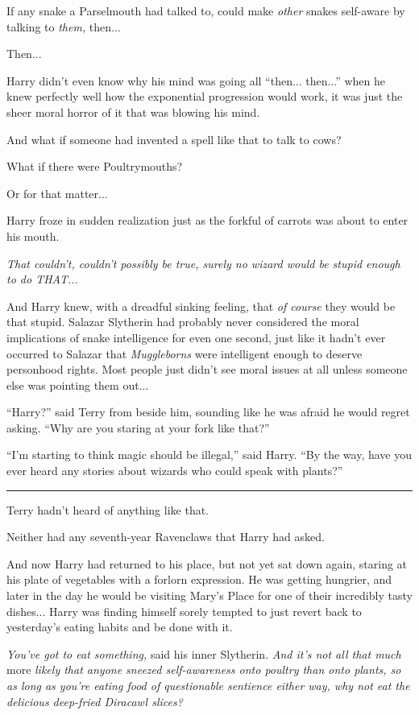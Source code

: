 If any snake a Parselmouth had talked to, could make \emph{other} snakes self-aware by talking to \emph{them,} then...

Then...

Harry didn't even know why his mind was going all ``then... then...'' when he knew perfectly well how the exponential progression would work, it was just the sheer moral horror of it that was blowing his mind.

And what if someone had invented a spell like that to talk to cows?

What if there were Poultrymouths?

Or for that matter...

Harry froze in sudden realization just as the forkful of carrots was about to enter his mouth.

\emph{That couldn't, couldn't possibly be true, surely no wizard would be stupid enough to do THAT...}

And Harry knew, with a dreadful sinking feeling, that \emph{of course} they would be that stupid. Salazar Slytherin had probably never considered the moral implications of snake intelligence for even one second, just like it hadn't ever occurred to Salazar that \emph{Muggleborns} were intelligent enough to deserve personhood rights. Most people just didn't see moral issues at all unless someone else was pointing them out...

``Harry?'' said Terry from beside him, sounding like he was afraid he would regret asking. ``Why are you staring at your fork like that?''

``I'm starting to think magic should be illegal,'' said Harry. ``By the way, have you ever heard any stories about wizards who could speak with plants?''

\begin{center}\rule{3in}{0.4pt}\end{center}

Terry hadn't heard of anything like that.

Neither had any seventh-year Ravenclaws that Harry had asked.

And now Harry had returned to his place, but not yet sat down again, staring at his plate of vegetables with a forlorn expression. He was getting hungrier, and later in the day he would be visiting Mary's Place for one of their incredibly tasty dishes... Harry was finding himself sorely tempted to just revert back to yesterday's eating habits and be done with it.

\emph{You've got to eat something,} said his inner Slytherin. \emph{And it's not all that much} more \emph{likely that anyone sneezed self-awareness onto poultry than onto plants, so as long as you're eating food of questionable sentience either way, why not eat the delicious deep-fried Diracawl slices?}

